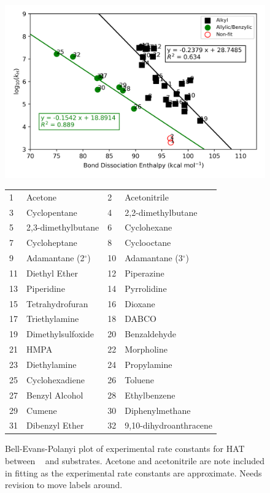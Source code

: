\begin{figure}[H]
  \centering
  \includegraphics[width=\textwidth]{figures/bde-bep}
\begin{tabularx}{\textwidth}{| l X l X |}
  \hline
  1 & Acetone & 2 & Acetonitrile \\
  3 & Cyclopentane & 4 & 2,2-dimethylbutane \\
  5 & 2,3-dimethylbutane & 6 & Cyclohexane \\
  7 & Cycloheptane & 8 & Cyclooctane \\
  9 & Adamantane (2$^\circ$) & 10 & Adamantane (3$^\circ$) \\
  11 & Diethyl Ether & 12 & Piperazine \\
  13 & Piperidine & 14 & Pyrrolidine \\
  15 & Tetrahydrofuran & 16 & Dioxane \\
  17 & Triethylamine & 18 & DABCO \\
  19 & Dimethylsulfoxide & 20 & Benzaldehyde \\
  21 & HMPA & 22 & Morpholine \\
  23 & Diethylamine & 24 & Propylamine \\
  25 & Cyclohexadiene & 26 & Toluene \\
  27 & Benzyl Alcohol & 28 & Ethylbenzene \\
  29 & Cumene & 30 & Diphenylmethane \\
  31 & Dibenzyl Ether & 32 & 9,10-dihydroanthracene \\
  \hline
\end{tabularx}
  \caption{Bell-Evans-Polanyi plot of experimental rate constants for HAT between \cumo~ and substrates. Acetone and acetonitrile are note included in fitting as the experimental rate constants are approximate. Needs revision to move labels around.}
\label{fig:bde-bep}
\end{figure}

